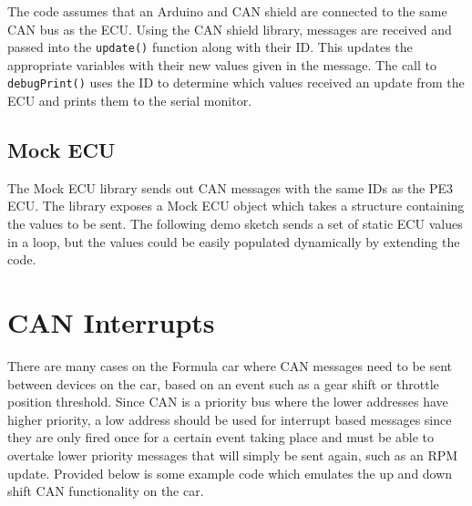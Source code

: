 \documentclass[letterpaper]{article}
\begin{document}
\lstset{basicstyle=\ttfamily\scriptsize}

\lstset{basicstyle=\ttfamily}

The code assumes that an Arduino and CAN shield are connected to the same CAN
bus as the ECU. Using the CAN shield library, messages are received and passed
into the \lstinline{update()} function along with their ID. This updates the
appropriate variables with their new values given in the message. The call to
\lstinline{debugPrint()} uses the ID to determine which values received an
update from the ECU and prints them to the serial monitor.

\subsection{Mock ECU}
The Mock ECU library sends out CAN messages with the same IDs as the PE3 ECU.
The library exposes a Mock ECU object which takes a structure containing the values
to be sent. The following demo sketch sends a set of static ECU values in a loop,
but the values could be easily populated dynamically by extending the code.

\lstset{basicstyle=\ttfamily\scriptsize}


\section{CAN Interrupts}
There are many cases on the Formula car where CAN messages need to be sent
between devices on the car, based on an event such as a gear shift or throttle
position threshold. Since CAN is a priority bus where the lower addresses have
higher priority, a low address should be used for interrupt based messages since
they are only fired once for a certain event taking place and must be able to
overtake lower priority messages that will simply be sent again, such as an RPM
update. Provided below is some example code which emulates the up and down shift
CAN functionality on the car.\\
\\
\\


\lstset{basicstyle=\ttfamily}
\end{document}
